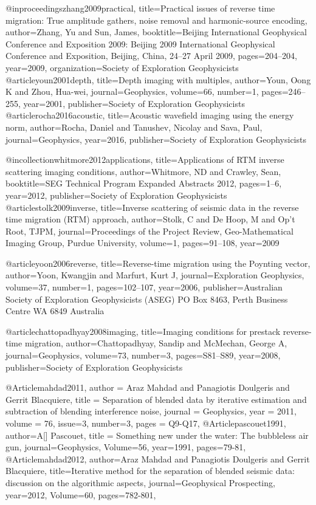 @inproceedings{zhang2009practical,
  title={Practical issues of reverse time migration: True amplitude gathers, noise removal and harmonic-source encoding},
  author={Zhang, Yu and Sun, James},
  booktitle={Beijing International Geophysical Conference and Exposition 2009: Beijing 2009 International Geophysical Conference and Exposition, Beijing, China, 24--27 April 2009},
  pages={204--204},
  year={2009},
  organization={Society of Exploration Geophysicists}
}
@article{youn2001depth,
  title={Depth imaging with multiples},
  author={Youn, Oong K and Zhou, Hua-wei},
  journal={Geophysics},
  volume={66},
  number={1},
  pages={246--255},
  year={2001},
  publisher={Society of Exploration Geophysicists}
}
@article{rocha2016acoustic,
  title={Acoustic wavefield imaging using the energy norm},
  author={Rocha, Daniel and Tanushev, Nicolay and Sava, Paul},
  journal={Geophysics},
  year={2016},
  publisher={Society of Exploration Geophysicists}
}

@incollection{whitmore2012applications,
  title={Applications of RTM inverse scattering imaging conditions},
  author={Whitmore, ND and Crawley, Sean},
  booktitle={SEG Technical Program Expanded Abstracts 2012},
  pages={1--6},
  year={2012},
  publisher={Society of Exploration Geophysicists}
}
@article{stolk2009inverse,
  title={Inverse scattering of seismic data in the reverse time migration (RTM) approach},
  author={Stolk, C and De Hoop, M and Op’t Root, TJPM},
  journal={Proceedings of the Project Review, Geo-Mathematical Imaging Group, Purdue University},
  volume={1},
  pages={91--108},
  year={2009}
}

@article{yoon2006reverse,
  title={Reverse-time migration using the Poynting vector},
  author={Yoon, Kwangjin and Marfurt, Kurt J},
  journal={Exploration Geophysics},
  volume={37},
  number={1},
  pages={102--107},
  year={2006},
  publisher={Australian Society of Exploration Geophysicists (ASEG) PO Box 8463, Perth Business Centre WA 6849 Australia}
}

@article{chattopadhyay2008imaging,
  title={Imaging conditions for prestack reverse-time migration},
  author={Chattopadhyay, Sandip and McMechan, George A},
  journal={Geophysics},
  volume={73},
  number={3},
  pages={S81--S89},
  year={2008},
  publisher={Society of Exploration Geophysicists}
}

@Article{mahdad2011,
  author = 	 {Araz Mahdad and Panagiotis Doulgeris and Gerrit Blacquiere},
  title = 	 {Separation of blended data by iterative estimation and subtraction of blending interference noise},
  journal = 	 {Geophysics},
  year = 	 2011,
  volume =	 76,
  issue=3,
  number=3,
  pages =	 {Q9-Q17},
}
@Article{pascouet1991,
  author={A[] Pascouet},
  title = {Something new under the water: The bubbleless air gun},
  journal={Geophysics},
  Volume=56,
  year=1991,
  pages={79-81},
}
@Article{mahdad2012,
  author={Araz Mahdad and Panagiotis Doulgeris and Gerrit Blacquiere},
  title={Iterative method for the separation of blended seismic data: discussion on the algorithmic aspects},
  journal={Geophysical Prospecting},
  year=2012,
  Volume=60,
  pages={782-801},
}




